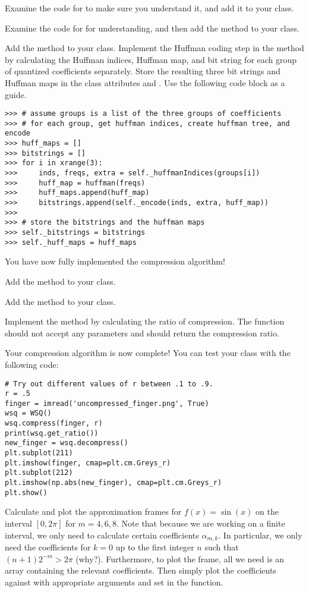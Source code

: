 Examine the code for  to make sure you understand it, and add it to your class.

Examine the code for  for understanding, and then add the method to your class.

Add the  method to your class.
Implement the Huffman coding step in the  method by calculating the Huffman indices, Huffman map, and bit string for each group of quantized coefficients separately.
Store the resulting three bit strings and Huffman maps in the class attributes  and .
Use the following code block as a guide.
\begin{lstlisting}
>>> # assume groups is a list of the three groups of coefficients
>>> # for each group, get huffman indices, create huffman tree, and encode
>>> huff_maps = []
>>> bitstrings = []
>>> for i in xrange(3):
>>>     inds, freqs, extra = self._huffmanIndices(groups[i])
>>>     huff_map = huffman(freqs)
>>>     huff_maps.append(huff_map)
>>>     bitstrings.append(self._encode(inds, extra, huff_map))
>>>
>>> # store the bitstrings and the huffman maps
>>> self._bitstrings = bitstrings
>>> self._huff_maps = huff_maps
\end{lstlisting}
You have now fully implemented the compression algorithm!

Add the  method to your class.

Add the  method to your class.

Implement the method  by calculating the ratio of compression.
The function should not accept any parameters and should return the compression ratio.

Your compression algorithm is now complete!
You can test your class with the following code:
\begin{lstlisting}
# Try out different values of r between .1 to .9.
r = .5
finger = imread('uncompressed_finger.png', True)
wsq = WSQ()
wsq.compress(finger, r)
print(wsq.get_ratio())
new_finger = wsq.decompress()
plt.subplot(211)
plt.imshow(finger, cmap=plt.cm.Greys_r)
plt.subplot(212)
plt.imshow(np.abs(new_finger), cmap=plt.cm.Greys_r)
plt.show()
\end{lstlisting}

Calculate and plot the approximation frames for $f(x) = \sin(x)$ on the interval $[0,2\pi]$
for $m = 4, 6, 8$. Note that because we are working on a finite interval,
we only need to calculate certain coefficients $\alpha_{m,k}$. In
particular, we only need the coefficients for $k = 0$ up to the first integer
$n$ such that $(n+1)2^{-m} > 2 \pi$ (why?). Furthermore, to plot the frame,
all we need is an array containing the relevant coefficients. Then simply plot
the coefficients against  with appropriate arguments
and set  in the  function.

